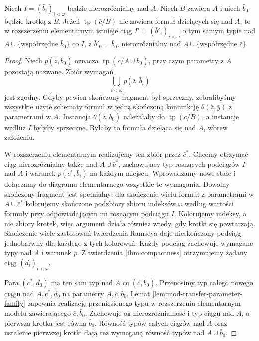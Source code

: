 \begin{lemat}
\label{lem:mod-dividing-extend-indisc}
Niech $I=(\bar b_i)_{i<\omega}$ będzie
nierozróżnialny nad $A$.
Niech $B$ zawiera $A$ i niech
$\bar b_0$ będzie krotką z $B$.
Jeżeli $\operatorname{tp}(\bar c/B)$
nie zawiera formuł dzielących się nad $A$,
to w rozszerzeniu elementarnym istnieje ciąg
$I'=(\bar b'_i)_{i<\omega}$ o tym samym
typie nad $A\cup\{\text{współrzędne }\bar b_0\}$
co $I$, z $\bar b'_0=\bar b_0$,
nierozróżnialny nad $A\cup\{\text{współrzędne }\bar c\}$.
\end{lemat}
\begin{proof}
Niech $p(\bar z,\bar b_0)$ oznacza
$\operatorname{tp}(\bar c/A\cup\bar b_0)$,
przy czym parametry z $A$ pozostają nazwane.
Zbiór wymagań
\[
\bigcup_{i<\omega}p(\bar z,\bar b_i)
\]
jest zgodny. Gdyby pewien skończony fragment
był sprzeczny, zebralibyśmy wszystkie
użyte schematy formuł w jedną skończoną
koniunkcję $\theta(\bar z,\bar y)$
z parametrami w $A$. Instancja
$\theta(\bar z,\bar b_0)$ należałaby do
$\operatorname{tp}(\bar c/B)$,
a instancje wzdłuż $I$ byłyby sprzeczne.
Byłaby to formuła dzieląca się nad $A$,
wbrew założeniu.

W rozszerzeniu elementarnym realizujemy
ten zbiór przez $\bar c^*$. Chcemy otrzymać
ciąg nierozróżnialny także nad $A\cup\bar c^*$,
zachowujący typ rosnących podciągów $I$ nad $A$
i warunek $p(\bar c^*,\bar b_i)$ na każdym miejscu.
Wprowadzamy nowe stałe i dołączamy do diagramu
elementarnego wszystkie te wymagania.
Dowolny skończony fragment jest spełnialny:
dla skończenie wielu formuł z parametrami
w $A\cup\bar c^*$ kolorujemy skończone
podzbiory zbioru indeksów $\omega$ według
wartości formuły przy odpowiadającym im
rosnącym podciągu $I$. Kolorujemy indeksy,
a nie zbiory krotek, więc argument działa
również wtedy, gdy krotki się powtarzają.
Skończenie wiele zastosowań twierdzenia
Ramseya daje nieskończony podciąg jednobarwny
dla każdego z tych kolorowań.
Każdy podciąg zachowuje wymagane typy nad $A$
i warunek $p$.
Z twierdzenia \ref{thm:compactness} otrzymujemy
żądany ciąg $(\bar d_i)_{i<\omega}$.

Para $(\bar c^*,\bar d_0)$ ma ten sam typ
nad $A$ co $(\bar c,\bar b_0)$.
Przenosimy typ całego nowego ciągu
nad $A,\bar c^*,\bar d_0$ na parametry
$A,\bar c,\bar b_0$.
Lemat \ref{lem:mod-transfer-parameter-family}
zapewnia realizację przeniesionego typu
w rozszerzeniu elementarnym modelu zawierającego
$\bar c,\bar b_0$.
Zachowuje on nierozróżnialność i typ ciągu
nad $A$, a pierwsza krotka jest równa $\bar b_0$.
Równość typów całych ciągów nad $A$
oraz ustalenie pierwszej krotki
dają też wymaganą równość typów nad
$A\cup\bar b_0$.
\end{proof}


